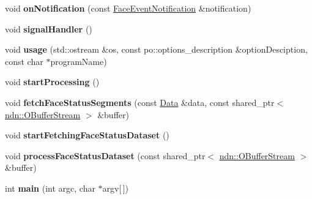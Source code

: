 \begin{DoxyCompactItemize}
\item 
void {\bfseries on\+Notification} (const \hyperlink{classndn_1_1nfd_1_1FaceEventNotification}{Face\+Event\+Notification} \&notification)\hypertarget{classndn_1_1nfd__autoreg_1_1AutoregServer_abcbd4a55abbd73234dab79239856bb4c}{}\label{classndn_1_1nfd__autoreg_1_1AutoregServer_abcbd4a55abbd73234dab79239856bb4c}

\item 
void {\bfseries signal\+Handler} ()\hypertarget{classndn_1_1nfd__autoreg_1_1AutoregServer_aa50514ddce6efe175f37dc28f061b0cb}{}\label{classndn_1_1nfd__autoreg_1_1AutoregServer_aa50514ddce6efe175f37dc28f061b0cb}

\item 
void {\bfseries usage} (std\+::ostream \&os, const po\+::options\+\_\+description \&option\+Desciption, const char $\ast$program\+Name)\hypertarget{classndn_1_1nfd__autoreg_1_1AutoregServer_a41b84a07bb661cfbc3bdd1d543fdc618}{}\label{classndn_1_1nfd__autoreg_1_1AutoregServer_a41b84a07bb661cfbc3bdd1d543fdc618}

\item 
void {\bfseries start\+Processing} ()\hypertarget{classndn_1_1nfd__autoreg_1_1AutoregServer_a20662ea80dc21f89f069a766d94b53f6}{}\label{classndn_1_1nfd__autoreg_1_1AutoregServer_a20662ea80dc21f89f069a766d94b53f6}

\item 
void {\bfseries fetch\+Face\+Status\+Segments} (const \hyperlink{classndn_1_1Data}{Data} \&data, const shared\+\_\+ptr$<$ \hyperlink{classndn_1_1OBufferStream}{ndn\+::\+O\+Buffer\+Stream} $>$ \&buffer)\hypertarget{classndn_1_1nfd__autoreg_1_1AutoregServer_a0534836d80eb896c3f5828596d1502c8}{}\label{classndn_1_1nfd__autoreg_1_1AutoregServer_a0534836d80eb896c3f5828596d1502c8}

\item 
void {\bfseries start\+Fetching\+Face\+Status\+Dataset} ()\hypertarget{classndn_1_1nfd__autoreg_1_1AutoregServer_ac0204420607e903720816e404d1cc1cc}{}\label{classndn_1_1nfd__autoreg_1_1AutoregServer_ac0204420607e903720816e404d1cc1cc}

\item 
void {\bfseries process\+Face\+Status\+Dataset} (const shared\+\_\+ptr$<$ \hyperlink{classndn_1_1OBufferStream}{ndn\+::\+O\+Buffer\+Stream} $>$ \&buffer)\hypertarget{classndn_1_1nfd__autoreg_1_1AutoregServer_a3033b0cece4067fb03da570895d04e13}{}\label{classndn_1_1nfd__autoreg_1_1AutoregServer_a3033b0cece4067fb03da570895d04e13}

\item 
int {\bfseries main} (int argc, char $\ast$argv\mbox{[}$\,$\mbox{]})\hypertarget{classndn_1_1nfd__autoreg_1_1AutoregServer_a46d66306646cf932ac6e687fca96b111}{}\label{classndn_1_1nfd__autoreg_1_1AutoregServer_a46d66306646cf932ac6e687fca96b111}

\end{DoxyCompactItemize}


